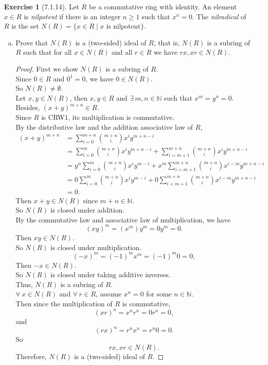 \documentclass{amsart}
\newcommand{\bbn}{\mathbb{N}}
\theoremstyle{plain}
\theoremstyle{definition}
\newtheorem{exer}[lem]{Exercise}
\begin{document}
\begin{exer}[7.1.14]
Let $R$ be a commutative ring with identity.
An element $x\in R$ is \emph{nilpotent} if there is an integer $n\geq 1$ such that $x^n=0$.
The \emph{nilradical} of $R$ is the set $N(R)=\{x\in R\mid\text{$x$ is nilpotent}\}$.
\begin{enumerate}[(a)]
\item Prove that $N(R)$ is a (two-sided) ideal of $R$, that is, $N(R)$ is a subring of $R$ such that
for all $x\in N(R)$ and all $r\in R$ we have $rx,xr\in N(R)$.
\begin{proof}
	First we show $N(R)$ is a subring of $R$.\\
	Since $0 \in R$ and $0^1 = 0$, we have $0 \in N(R)$.\\
	So $N(R) \neq \emptyset$.\\
	Let $x,y \in N(R)$, then $x,y\in R$ and $\exists\ m,n\in\bbn$ such that $x^m = y^n = 0$.\\
	Besides, $(x+y)^{m+n} \in R$.\\
	Since $R$ is CRW1, its multiplication is commutative.\\
	By the distributive law and the addition associative law of $R$,
	 \begin{align*}
	   (x+y)^{m+n} &= \sum_{i=0}^{m+n}\binom {m+n}ix^iy^{m+n-i}\\
	   				&=\sum_{i=0}^{m}\binom {m+n}ix^iy^{m+n-i} + \sum_{i=m+1}^{m+n}\binom {m+n}ix^iy^{m+n-i} \\
			  &=y^n\sum_{i=0}^{m}\binom {m+n}ix^iy^{m-i} + x^m\sum_{i=m+1}^{m+n}\binom {m+n}ix^{i-m}y^{m+n-i}\\
	   	&=0\sum_{i=0}^{m}\binom {m+n}ix^iy^{m-i} + 0 \sum_{i=m+1}^{m+n}\binom {m+n}ix^{i-m}y^{m+n-i} \\
	   	&=0.
	\end{align*}
	Then $x+y \in N(R)$ since $m+n \in \bbn$.\\
 	So $N(R)$ is closed under addition.\\
 	By the commutative law and associative law of multiplication, we have
 	\[(xy)^{m} = (x^m)y^m = 0y^m = 0.\]
 	Then $xy \in N(R)$.\\
 	So $N(R)$ is closed under multiplication.\\
 	\[(-x)^{m} = (-1)^mx^m =(-1)^m 0 = 0, \]
 	Then $-x \in N(R)$.\\
 	So $N(R)$ is closed under taking additive inverses.\\
 	Thus, $N(R)$ is a subring of $R$.\\
	$\forall\ x \in N(R)$ and $\forall\ r \in R$, assume $x^n = 0$ for some $n \in \bbn$.\\
	Then since the multiplication of $R$ is commutative,
	\[(xr)^n = x^nr^n = 0r^n = 0,\]
	and
	\[(rx)^n = r^nx^n = r^n 0 = 0.\]
	So 
	\[rx, xr\in N(R).\]
	Therefore, $N(R)$ is a (two-sided) ideal of $R$.


\end{proof}
\end{enumerate}
\end{exer}
\end{document}
